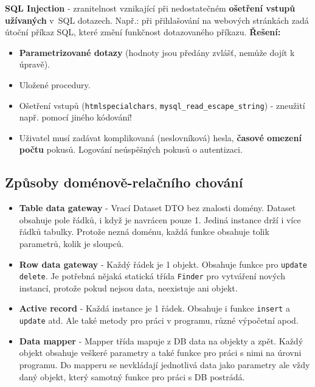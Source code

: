 \textbf{SQL Injection} - zranitelnost vznikající při nedostatečném \textbf{ošetření vstupů užívaných} v SQL dotazech. Např.: při přihlašování na webových stránkách zadá útoční příkaz SQL, které změní funkčnost dotazovaného příkazu. \textbf{Řešení:}
\begin{itemize}
\item \textbf{Parametrizované dotazy} (hodnoty jsou předány zvlášť, nemůže dojít k úpravě).
\item Uložené procedury.
\item Ošetření vstupů (\texttt{htmlspecialchars}, \texttt{mysql\_read\_escape\_string}) - zneužití např. pomocí jiného kódování!
\item Uživatel musí zadávat komplikovaná (neslovníková) hesla, \textbf{časové omezení počtu} pokusů. Logování neúspěšných pokusů o autentizaci.
\end{itemize}

\subsection{Způsoby doménově-relačního chování}
\begin{itemize}
    \item \textbf{Table data gateway} - Vrací Dataset DTO bez znalosti domény. Dataset obsahuje pole řádků, i když je navrácen pouze 1. Jediná instance drží i více řádků tabulky. Protože nezná doménu, každá funkce obsahuje tolik parametrů, kolik je sloupců. 
    \item \textbf{Row data gateway} - Každý řádek je 1 objekt. Obsahuje funkce pro \texttt{update} \texttt{delete}. Je potřebná nějaká statická třída \texttt{Finder} pro vytváření nových instancí, protože pokud nejsou data, neexistuje ani objekt.
    \item \textbf{Active record} - Každá instance je 1 řádek. Obsahuje i funkce \texttt{insert} a \texttt{update} atd. Ale také metody pro práci v programu, různé výpočetní apod.
    \item \textbf{Data mapper} - Mapper třída mapuje z DB data na objekty a zpět. Každý objekt obsahuje veškeré parametry a také funkce pro práci s nimi na úrovni programu. Do mapperu se nevkládají jednotlivá data jako parametry ale vždy daný objekt, který samotný funkce pro práci s DB postrádá.
\end{itemize}

